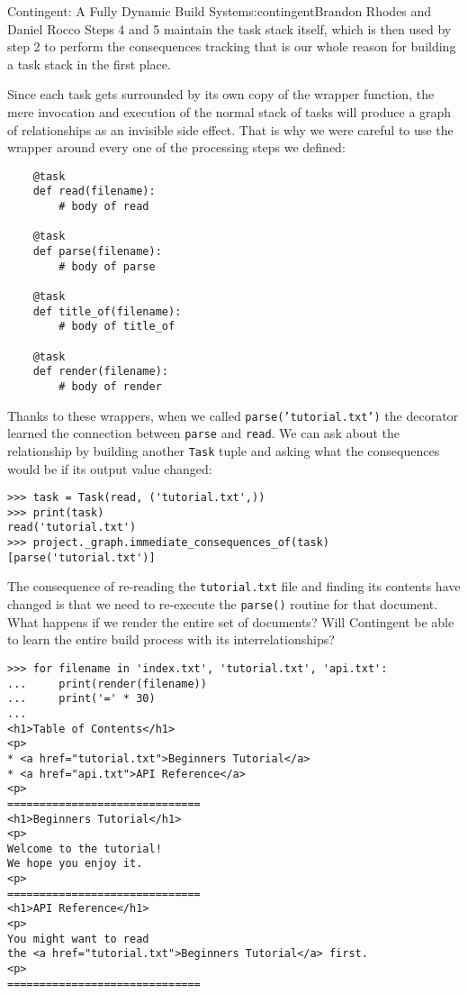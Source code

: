 \begin{aosachapter}{Contingent: A Fully Dynamic Build System}{s:contingent}{Brandon Rhodes and Daniel Rocco}
Steps 4 and 5 maintain the task stack itself, which is then used by step
2 to perform the consequences tracking that is our whole reason for
building a task stack in the first place.

Since each task gets surrounded by its own copy of the wrapper function,
the mere invocation and execution of the normal stack of tasks will
produce a graph of relationships as an invisible side effect. That is
why we were careful to use the wrapper around every one of the
processing steps we defined:

\begin{verbatim}
    @task
    def read(filename):
        # body of read

    @task
    def parse(filename):
        # body of parse

    @task
    def title_of(filename):
        # body of title_of

    @task
    def render(filename):
        # body of render
\end{verbatim}

Thanks to these wrappers, when we called \texttt{parse('tutorial.txt')}
the decorator learned the connection between \texttt{parse} and
\texttt{read}. We can ask about the relationship by building another
\texttt{Task} tuple and asking what the consequences would be if its
output value changed:

\begin{verbatim}
>>> task = Task(read, ('tutorial.txt',))
>>> print(task)
read('tutorial.txt')
>>> project._graph.immediate_consequences_of(task)
[parse('tutorial.txt')]
\end{verbatim}

The consequence of re-reading the \texttt{tutorial.txt} file and finding
its contents have changed is that we need to re-execute the
\texttt{parse()} routine for that document. What happens if we render
the entire set of documents? Will Contingent be able to learn the entire
build process with its interrelationships?

\begin{verbatim}
>>> for filename in 'index.txt', 'tutorial.txt', 'api.txt':
...     print(render(filename))
...     print('=' * 30)
...
<h1>Table of Contents</h1>
<p>
* <a href="tutorial.txt">Beginners Tutorial</a>
* <a href="api.txt">API Reference</a>
<p>
==============================
<h1>Beginners Tutorial</h1>
<p>
Welcome to the tutorial!
We hope you enjoy it.
<p>
==============================
<h1>API Reference</h1>
<p>
You might want to read
the <a href="tutorial.txt">Beginners Tutorial</a> first.
<p>
==============================
\end{verbatim}


\end{aosachapter}
